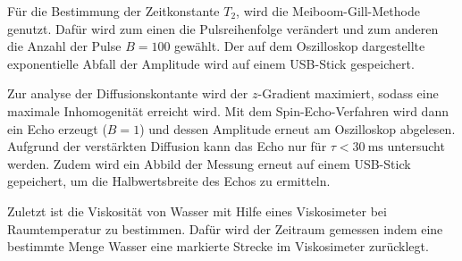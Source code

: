 Für die Bestimmung der Zeitkonstante $T_2$, wird die Meiboom-Gill-Methode genutzt. Dafür wird zum einen die Pulsreihenfolge verändert und zum anderen die Anzahl der Pulse $B=100$ gewählt. Der auf dem Oszilloskop dargestellte exponentielle Abfall der Amplitude wird auf einem USB-Stick gespeichert. 

Zur analyse der Diffusionskontante wird der $z$-Gradient maximiert, sodass eine maximale Inhomogenität erreicht wird. Mit dem Spin-Echo-Verfahren wird dann ein Echo erzeugt ($B=1$) und dessen Amplitude erneut am Oszilloskop abgelesen. Aufgrund der verstärkten Diffusion kann das Echo nur für $\tau<\SI{30}{\milli\second}$ untersucht werden. Zudem wird ein Abbild der Messung erneut auf einem USB-Stick gepeichert, um die Halbwertsbreite des Echos zu ermitteln.

Zuletzt ist die Viskosität von Wasser mit Hilfe eines Viskosimeter bei Raumtemperatur zu bestimmen. Dafür wird der Zeitraum gemessen indem eine bestimmte Menge Wasser eine markierte Strecke im Viskosimeter zurücklegt.